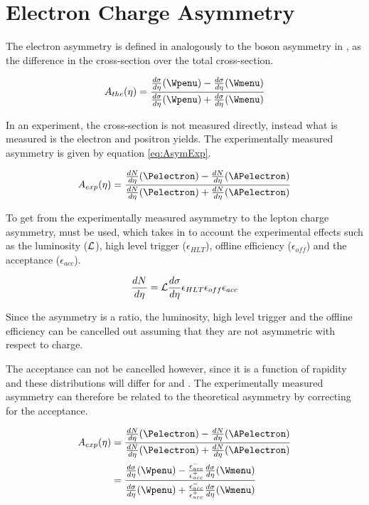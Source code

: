 \section{Electron Charge Asymmetry}

The electron asymmetry is defined in  analogously to the
\PW boson asymmetry in , as the difference in the
\inclusiveWe cross-section over the total \inclusiveWe cross-section.

\begin{equation}
A_{the}(\eta)=\frac{  \frac{d\sigma}{d\eta}(\Wpenu) -
\frac{d\sigma}{d\eta}(\Wmenu) }{ \frac{d\sigma}{d\eta}(\Wpenu) +
\frac{d\sigma}{d\eta}(\Wmenu) }
\label{eq:AsymThe}
\end{equation} 

In an experiment, the cross-section is not measured directly, instead what is
measured is the electron and positron yields.  The experimentally measured
asymmetry is given by equation \ref{eq:AsymExp}.\cite{kom}
 
\begin{equation}
A_{exp}(\eta)=\frac{  \frac{dN}{d\eta}(\Pelectron) -
\frac{dN}{d\eta}(\APelectron) }{ \frac{dN}{d\eta}(\Pelectron) +
\frac{dN}{d\eta}(\APelectron) }
\label{eq:AsymExp}
\end{equation} 

To get from the experimentally measured asymmetry to the lepton charge
asymmetry,  must be used, which takes in to
account the experimental effects such as the luminosity (${\cal L}$), high
level trigger ($\epsilon_{HLT}$), offline efficiency ($ \epsilon_{off}$) and
the acceptance ($\epsilon_{acc}$).

\begin{equation}
\frac{dN}{d\eta} = {\cal L } \frac{d\sigma}{d\eta}  \epsilon_{HLT}
\epsilon_{off} \epsilon_{acc}
\label{eq:NumEve}
\end{equation} 

Since the asymmetry is a ratio, the luminosity, high level trigger and the
offline efficiency can be cancelled out assuming that they are not asymmetric
with respect to charge.\cite{me} 

The acceptance can not be cancelled however, since it is a function of rapidity and 
these distributions will differ for \Pelectron and \APelectron.
The experimentally measured asymmetry can therefore be related to the
theoretical asymmetry by correcting for the acceptance.\cite{me}

\begin{align} 
A_{exp}(\eta) &= \frac{ \frac{dN}{d\eta}(\Pelectron) -
\frac{dN}{d\eta}(\APelectron) }{ \frac{dN}{d\eta}(\Pelectron) +
\frac{dN}{d\eta}(\APelectron) }\\   
              &= \frac{ \frac{d\sigma}{d\eta}(\Wpenu) -
\frac{\epsilon^{-}_{acc}}{\epsilon^{+}_{acc}} \frac{d\sigma}{d\eta}(\Wmenu) }{
\frac{d\sigma}{d\eta}(\Wpenu) + \frac{\epsilon^{-}_{acc}}{\epsilon^{+}_{acc}}
\frac{d\sigma}{d\eta}(\Wmenu) }
\label{eq:AsymExpCorr}
\end{align}

